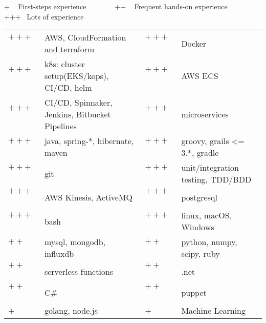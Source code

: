 
\newcommand{\plus}{$+~$~~~~}
\newcommand{\pplus}{$++~$~~~~}
\newcommand{\ppplus}{$+++$~~~~~}
\begin{cventries}
\cventry
{+ ~ First-steps experience ~~~  ~~~ ++ ~ Frequent hands-on experience ~~~  ~~~ +++ ~Lots of experience \vspace{0.1em}} %
{} %
{} %
{} %
{ %
\hspace{1em}
\setlength{\tabcolsep}{3pt}
\begin{tabular}{  l l @{\hskip 1in} l l }
		   \ppplus & AWS, CloudFormation and terraform &  \ppplus & Docker\\
		   \ppplus & k8s: cluster setup(EKS/kops), CI/CD, helm & \ppplus & AWS ECS\\
		   \ppplus & CI/CD, Spinnaker, Jenkins, Bitbucket Pipelines & \ppplus & microservices \\
           \ppplus & java, spring-*, hibernate, maven  & \ppplus & groovy, grails <= 3.*, gradle \\ 
           \ppplus & git & \ppplus & unit/integration testing, TDD/BDD   \\
		   \ppplus & AWS Kinesis, ActiveMQ & \ppplus & postgresql\\
           \ppplus & bash\vspace{0.7em} & \ppplus & linux, macOS, Windows\\ 
           \pplus & mysql, mongodb, influxdb & \pplus &python, numpy, scipy, ruby \\ 
           \pplus & serverless functions  & \pplus & .net  \\
           \pplus & C\# & \pplus & puppet \\
           \plus & golang, node.js & \plus & Machine Learning 
\end{tabular}
}
\end{cventries}
